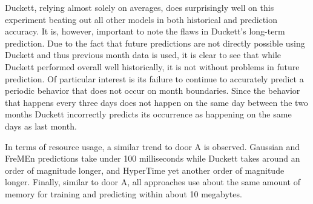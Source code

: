 Duckett, relying almost solely on averages, does surprisingly well on this
experiment beating out all other models in both historical and prediction
accuracy.  It is, however, important to note the flaws in Duckett's long-term
prediction. Due to the fact that future predictions are not directly possible
using Duckett and thus previous month data is used, it is clear to see that
while Duckett performed overall well historically, it is not without problems
in future prediction.  Of particular interest is its failure to continue to
accurately predict a periodic behavior that does not occur on month
boundaries. Since the behavior that happens every three days does not happen
on the same day between the two months Duckett incorrectly predicts its
occurrence as happening on the same days as last month.

In terms of resource usage, a similar trend to door A is observed. Gaussian
and FreMEn predictions take under 100 milliseconds while Duckett takes around
an order of magnitude longer, and HyperTime yet another order of magnitude
longer. Finally, similar to door A, all approaches use about the same amount
of memory for training and predicting within about 10 megabytes.

